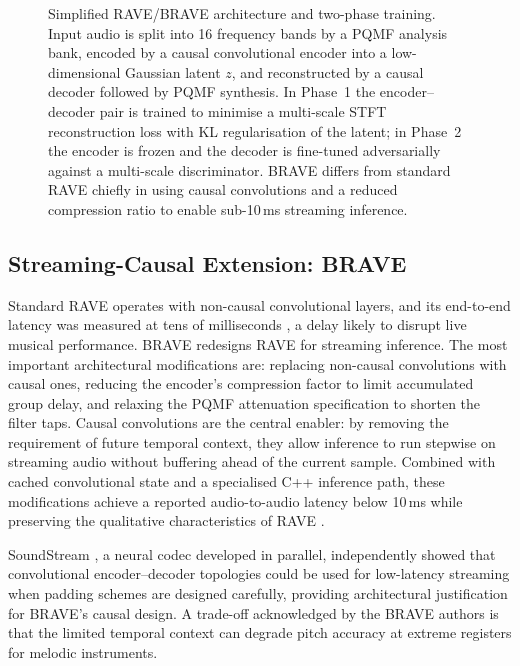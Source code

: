 \documentclass[a4paper,11pt,oneside,openany]{book}
\begin{document}
\begin{figure}[H]
{}
\caption{Simplified RAVE/BRAVE architecture and two-phase training. Input audio is split into 16 frequency bands by a PQMF analysis bank, encoded by a causal convolutional encoder into a low-dimensional Gaussian latent $z$, and reconstructed by a causal decoder followed by PQMF synthesis. In Phase~1 the encoder--decoder pair is trained to minimise a multi-scale STFT reconstruction loss with KL regularisation of the latent; in Phase~2 the encoder is frozen and the decoder is fine-tuned adversarially against a multi-scale discriminator. BRAVE differs from standard RAVE chiefly in using causal convolutions and a reduced compression ratio to enable sub-10\,ms streaming inference.}
\label{fig:rave_arch}
\end{figure}

\subsection*{Streaming-Causal Extension: BRAVE}

Standard RAVE operates with non-causal convolutional layers, and its end-to-end latency was measured at tens of milliseconds \parencite{caillon2021rave}, a delay likely to disrupt live musical performance. BRAVE \parencite{caspe2025brave} redesigns RAVE for streaming inference. The most important architectural modifications are: replacing non-causal convolutions with causal ones, reducing the encoder's compression factor to limit accumulated group delay, and relaxing the PQMF attenuation specification to shorten the filter taps. Causal convolutions are the central enabler: by removing the requirement of future temporal context, they allow inference to run stepwise on streaming audio without buffering ahead of the current sample. Combined with cached convolutional state and a specialised C++ inference path, these modifications achieve a reported audio-to-audio latency below 10\,ms while preserving the qualitative characteristics of RAVE \parencite{caspe2025brave}.

SoundStream \parencite{zeghidour2022soundstream}, a neural codec developed in parallel, independently showed that convolutional encoder--decoder topologies could be used for low-latency streaming when padding schemes are designed carefully, providing architectural justification for BRAVE's causal design. A trade-off acknowledged by the BRAVE authors is that the limited temporal context can degrade pitch accuracy at extreme registers for melodic instruments.
\end{document}
